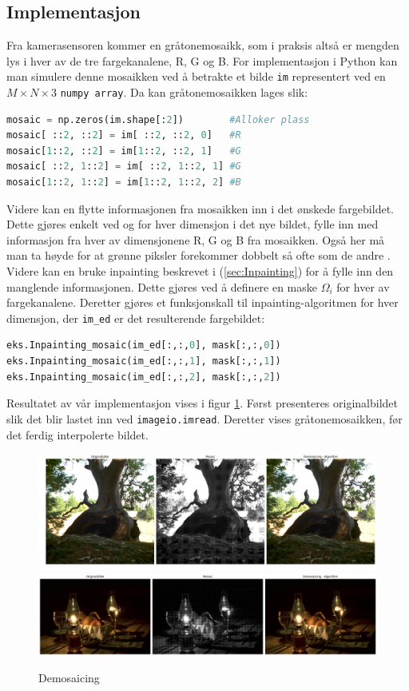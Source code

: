 \subsection{Implementasjon}
Fra kamerasensoren kommer en gråtonemosaikk, som i praksis altså er mengden lys i hver av de tre fargekanalene, R, G og B. For implementasjon i Python kan man simulere denne mosaikken ved å betrakte et bilde \texttt{im} representert ved en $M\times N \times 3$ \texttt{numpy array}. Da kan gråtonemosaikken lages slik:
\begin{lstlisting}[language=Python]
mosaic = np.zeros(im.shape[:2])        #Alloker plass
mosaic[ ::2, ::2] = im[ ::2, ::2, 0]   #R 
mosaic[1::2, ::2] = im[1::2, ::2, 1]   #G
mosaic[ ::2, 1::2] = im[ ::2, 1::2, 1] #G
mosaic[1::2, 1::2] = im[1::2, 1::2, 2] #B
\end{lstlisting}
\newpage
Videre kan en flytte informasjonen fra mosaikken inn i det ønskede fargebildet. Dette gjøres enkelt ved og for hver dimensjon i det nye bildet, fylle inn med informasjon fra hver av dimensjonene R, G og B fra mosaikken. Også her må man ta høyde for at grønne piksler forekommer dobbelt så ofte som de andre \cite{Demosaic38:online}. Videre kan en bruke inpainting beskrevet i (\ref{sec:Inpainting}) for å fylle inn den manglende informasjonen. Dette gjøres ved å definere en maske $\Omega_i$ for hver av fargekanalene. Deretter gjøres et funksjonskall til inpainting-algoritmen for hver dimensjon, der \texttt{im\_ed} er det resulterende fargebildet:
\begin{lstlisting}[language=Python]
eks.Inpainting_mosaic(im_ed[:,:,0], mask[:,:,0])
eks.Inpainting_mosaic(im_ed[:,:,1], mask[:,:,1])
eks.Inpainting_mosaic(im_ed[:,:,2], mask[:,:,2])
\end{lstlisting}
Resultatet av vår implementasjon vises i figur \ref{Figur 5}. Først presenteres originalbildet slik det blir lastet inn ved \texttt{imageio.imread}. Deretter vises gråtonemosaikken, før det ferdig interpolerte bildet. 
\\[1cm]
\begin{figure}[H]
\begin{center}
    \includegraphics[width=1\columnwidth]{bilder/tree_mosaic.png} 
    \includegraphics[width=1\columnwidth]{bilder/stillLife_mosaic.png}
    \caption{Demosaicing \label{Figur 5}}
\end{center}
\end{figure}
